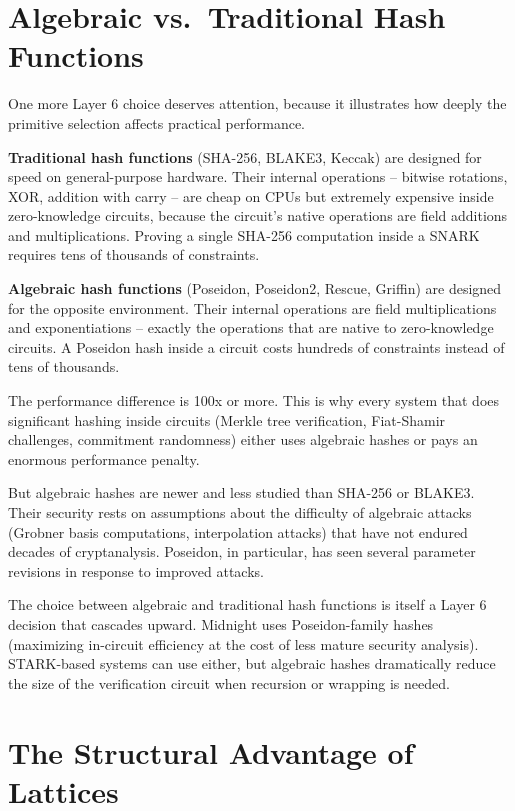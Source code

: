 \documentclass[
  11pt,
  openany]{report}
\renewcommand{\textbf}[1]{{\bfseries\color{MidnightBold}#1}}
\begin{document}
\section{Algebraic vs.~Traditional Hash
Functions}\label{algebraic-vs.-traditional-hash-functions}

One more Layer 6 choice deserves attention, because it illustrates how deeply
the primitive selection affects practical performance.

\textbf{Traditional hash functions} (SHA-256, BLAKE3, Keccak) are designed for
speed on general-purpose hardware. Their internal operations -- bitwise
rotations, XOR, addition with carry -- are cheap on CPUs but extremely expensive
inside zero-knowledge circuits, because the circuit's native operations are
field additions and multiplications. Proving a single SHA-256 computation inside
a SNARK requires tens of thousands of constraints.

\textbf{Algebraic hash functions} (Poseidon, Poseidon2, Rescue, Griffin) are
designed for the opposite environment. Their internal operations are field
multiplications and exponentiations -- exactly the operations that are native to
zero-knowledge circuits. A Poseidon hash inside a circuit costs hundreds of
constraints instead of tens of thousands.

The performance difference is 100x or more. This is why every system that does
significant hashing inside circuits (Merkle tree verification, Fiat-Shamir
challenges, commitment randomness) either uses algebraic hashes or pays an
enormous performance penalty.

But algebraic hashes are newer and less studied than SHA-256 or BLAKE3. Their
security rests on assumptions about the difficulty of algebraic attacks (Grobner
basis computations, interpolation attacks) that have not endured decades of
cryptanalysis. Poseidon, in particular, has seen several parameter revisions in
response to improved attacks.

The choice between algebraic and traditional hash functions is itself a Layer 6
decision that cascades upward. Midnight uses Poseidon-family hashes (maximizing
in-circuit efficiency at the cost of less mature security analysis). STARK-based
systems can use either, but algebraic hashes dramatically reduce the size of the
verification circuit when recursion or wrapping is needed.

\section{The Structural Advantage of
Lattices}\label{the-structural-advantage-of-lattices}
\end{document}
